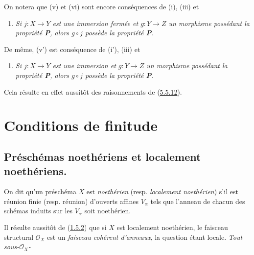 \begin{env}[5.5.13]
\label{I.5.5.13-fr}
On notera que (v) et (vi) sont encore conséquences de (i), (iii) et
\begin{enumerate}
  \item[\rm(ii')] \emph{Si $j:X\to Y$ est une immersion fermée et
    $g:Y\to Z$ un morphisme possédant la propriété \textbf{P}, alors
    $g\circ j$ possède la propriété \textbf{P}.}
\end{enumerate}
De même, (v') est conséquence de (i'), (iii) et
\begin{enumerate}
  \item[\rm(ii'')] \emph{Si $j:X\to Y$ est une immersion et $g:Y\to Z$ un
    morphisme possédant la propriété \textbf{P}, alors $g\circ j$ possède la
    propriété \textbf{P}.}
\end{enumerate}
Cela résulte en effet aussitôt des raisonnements de
(\hyperref[I.5.5.12-fr]{5.5.12}).
\end{env}

\section{Conditions de finitude}
\label{section:I.6-fr}

\subsection{Préschémas noethériens et localement noethériens.}
\label{subsection:I.6.1-fr}

\begin{definition}[6.1.1]
\label{I.6.1.1-fr}
On dit qu'un préschéma $X$ est \emph{noethérien} (resp. \emph{localement
noethérien}) s'il est réunion finie (resp. réunion) d'ouverts affines
$V_\alpha$ tels que l'anneau de chacun des schémas induits sur les $V_\alpha$
soit noethérien.
\end{definition}

Il résulte aussitôt de (\hyperref[I.1.5.2-fr]{1.5.2}) que si $X$ est
localement noethérien, le faisceau structural $\mathscr{O}_X$ est un
\emph{faisceau cohérent d'anneaux}, la question étant locale. \emph{Tout
sous-$\mathscr{O}_X$-}

